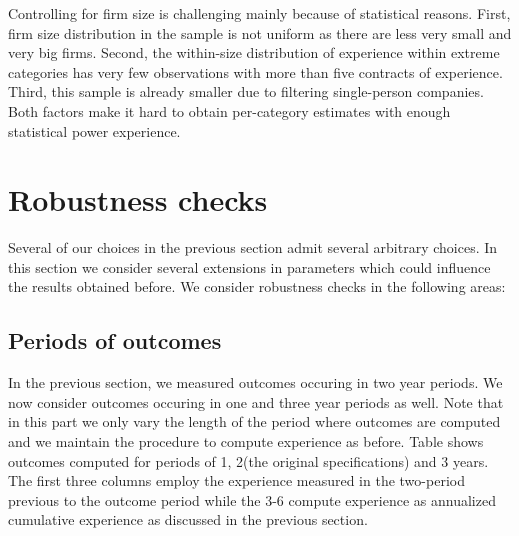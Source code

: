 Controlling for firm size is challenging mainly because of statistical reasons. First, firm size distribution in the sample is not uniform as there are less very small and very big firms. Second, the within-size distribution of experience within extreme categories has very few observations with more than five contracts of experience. Third, this sample is already smaller due to filtering single-person companies. Both factors make it hard to obtain per-category estimates with enough statistical power experience.

\newpage





%
\section{Robustness checks}
Several of our choices in the previous section admit several arbitrary choices. In this section we consider several extensions in parameters which could influence the results obtained before. We consider robustness checks in the following areas:

\subsection{Periods of outcomes}
In the previous section, we measured outcomes occuring in two year periods. We now consider outcomes occuring in one and three year periods as well. Note that in this part we only vary the length of the period where outcomes are computed and we maintain the procedure to compute experience as before. Table shows outcomes computed for periods of 1, 2(the original specifications) and 3 years. The first three columns employ the experience measured in the two-period previous to the outcome period while the 3-6 compute experience as annualized cumulative experience as discussed in the previous section.

